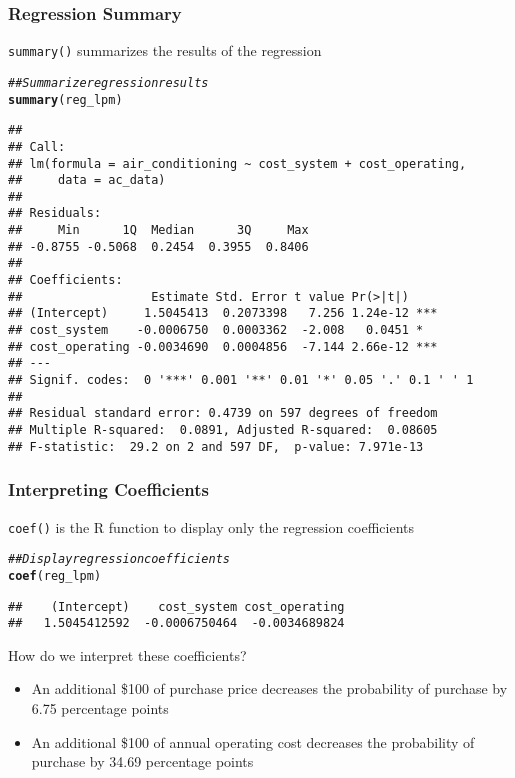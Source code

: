 \documentclass{beamer}\usepackage[]{graphicx}\usepackage[]{color}
\makeatletter
\newcommand{\hlcom}[1]{\textcolor[rgb]{0.678,0.584,0.686}{\textit{#1}}}%
\newcommand{\hlstd}[1]{\textcolor[rgb]{0.345,0.345,0.345}{#1}}%
\newcommand{\hlkwd}[1]{\textcolor[rgb]{0.737,0.353,0.396}{\textbf{#1}}}%
\newenvironment{kframe}{%
 \def\at@end@of@kframe{}%
 \ifinner\ifhmode%
  \def\at@end@of@kframe{\end{minipage}}%
  \begin{minipage}{\columnwidth}%
 \fi\fi%
 \def\FrameCommand##1{\hskip\@totalleftmargin \hskip-\fboxsep
 \colorbox{shadecolor}{##1}\hskip-\fboxsep
     \hskip-\linewidth \hskip-\@totalleftmargin \hskip\columnwidth}%
 \MakeFramed {\advance\hsize-\width
   \@totalleftmargin\z@ \linewidth\hsize
   \@setminipage}}%
 {\par\unskip\endMakeFramed%
 \at@end@of@kframe}
\newenvironment{knitrout}{}{} %
\makeatother
\begin{document}
\begin{frame}[fragile]\frametitle{Regression Summary}
    \texttt{summary()} summarizes the results of the regression
    \vspace{1ex}
\begin{knitrout}\scriptsize
{}\color{fgcolor}\begin{kframe}
\begin{alltt}
\hlcom{## Summarize regression results}
\hlkwd{summary}\hlstd{(reg_lpm)}
\end{alltt}
\begin{verbatim}
## 
## Call:
## lm(formula = air_conditioning ~ cost_system + cost_operating, 
##     data = ac_data)
## 
## Residuals:
##     Min      1Q  Median      3Q     Max 
## -0.8755 -0.5068  0.2454  0.3955  0.8406 
## 
## Coefficients:
##                  Estimate Std. Error t value Pr(>|t|)    
## (Intercept)     1.5045413  0.2073398   7.256 1.24e-12 ***
## cost_system    -0.0006750  0.0003362  -2.008   0.0451 *  
## cost_operating -0.0034690  0.0004856  -7.144 2.66e-12 ***
## ---
## Signif. codes:  0 '***' 0.001 '**' 0.01 '*' 0.05 '.' 0.1 ' ' 1
## 
## Residual standard error: 0.4739 on 597 degrees of freedom
## Multiple R-squared:  0.0891,	Adjusted R-squared:  0.08605 
## F-statistic:  29.2 on 2 and 597 DF,  p-value: 7.971e-13
\end{verbatim}
\end{kframe}
\end{knitrout}
\end{frame}

\begin{frame}[fragile]\frametitle{Interpreting Coefficients}
    \texttt{coef()} is the R function to display only the regression coefficients
\begin{knitrout}\footnotesize
{}\color{fgcolor}\begin{kframe}
\begin{alltt}
\hlcom{## Display regression coefficients}
\hlkwd{coef}\hlstd{(reg_lpm)}
\end{alltt}
\begin{verbatim}
##    (Intercept)    cost_system cost_operating 
##   1.5045412592  -0.0006750464  -0.0034689824
\end{verbatim}
\end{kframe}
\end{knitrout}
    \vspace{2ex}
    How do we interpret these coefficients?
    \begin{itemize}
        \item An additional \$100 of purchase price decreases the probability of purchase by 6.75 percentage points
        \item An additional \$100 of annual operating cost decreases the probability of purchase by 34.69 percentage points
    \end{itemize}
\end{frame}
\end{document}

